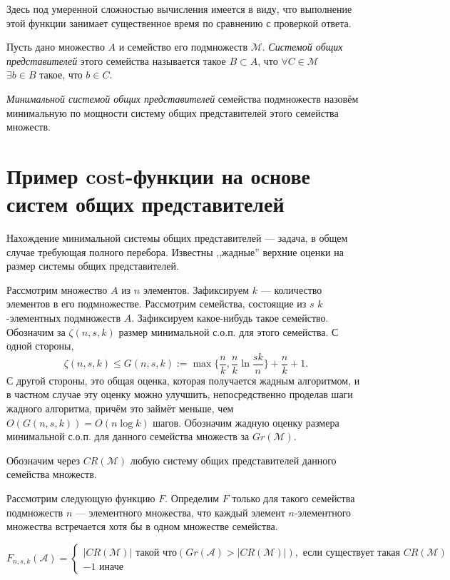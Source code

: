 \documentclass{article}
\begin{document}
Здесь под умеренной сложностью вычисления имеется в виду, что выполнение этой функции занимает существенное время по сравнению с проверкой ответа.

Пусть дано множество $A$ и семейство его подмножеств $\mathcal{M}$. \textit{Системой общих представителей} этого семейства называется такое $B \subset A$, что $\forall C \in \mathcal{M}$ $\exists b \in B \text{ такое, что } b \in C$. 

\textit{Минимальной системой общих представителей} семейства подмножеств назовём минимальную по мощности систему общих представителей этого семейства множеств.

\section{Пример cost-функции на основе систем общих представителей}

    Нахождение минимальной системы общих представителей --- задача, в общем случае требующая полного перебора. Известны ,,жадные'' верхние оценки на размер системы общих представителей. 

    Рассмотрим множество $A$ из $n$ элементов. Зафиксируем $k$ --- количество элементов в его подмножестве. Рассмотрим семейства, состоящие из $s$ $k$-элементных подмножеств $A$. Зафиксируем какое-нибудь такое семейство.
    Обозначим за $\zeta(n, s, k)$ размер минимальной с.о.п. для этого семейства. С одной стороны, $$\zeta(n, s, k) \leq G(n, s, k) := \max\{\frac{n}{k}, \frac{n}{k} \ln \frac{sk}{n}\} + \frac{n}{k} + 1.$$ С другой стороны, это общая оценка, которая получается жадным алгоритмом, и в частном случае эту оценку можно улучшить, непосредственно проделав шаги жадного алгоритма, причём это займёт меньше, чем $O(G(n, s, k)) = O(n \log k)$ шагов. Обозначим жадную оценку размера минимальной с.о.п. для данного семейства множеств за $Gr(\mathcal{M})$.

    Обозначим через $CR(\mathcal{M})$ любую систему общих представителей данного семейства множеств.

    Рассмотрим следующую функцию $F$. Определим $F$ только для такого семейства подмножеств $n$ --- элементного множества, что каждый элемент $n$-элементного множества встречается хотя бы в одном множестве семейства.

\begin{equation*}
    F_{n,s,k}(\mathcal{A}) = 
     \begin{cases}
       |CR(\mathcal{M})| \text{ такой что} (Gr(\mathcal{A}) > |CR(\mathcal{M})|), \text{ если существует такая } CR(\mathcal{M}) \\
       -1 \text{ иначе}
    \end{cases}
\end{equation*}
    
\end{document}
